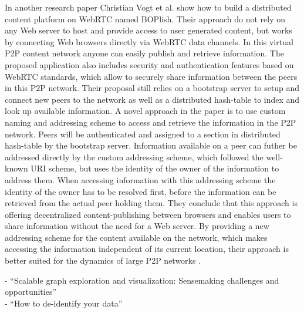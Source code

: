 In another research paper Christian Vogt et al. show how to build a distributed content platform on \gls{WebRTC} named BOPlish. Their approach do not rely on any Web server to host and provide access to user generated content, but works by connecting Web browsers directly via \gls{WebRTC} data channels. In this virtual \gls{P2P} content network anyone can easily publish and retrieve information. The proposed application also includes security and authentication features based on \gls{WebRTC} standards, which allow to securely share information between the peers in this \gls{P2P} network. Their proposal still relies on a bootstrap server to setup and connect new peers to the network as well as a distributed hash-table to index and look up available information. A novel approach in the paper is to use custom naming and addressing scheme to access and retrieve the information in the \gls{P2P} network. Peers will be authenticated and assigned to a section in distributed hash-table by the bootstrap server. Information available on a peer can futher be addressed directly by the custom addressing scheme, which followed the well-known \gls{URI} scheme, but uses the identity of the owner of the information to address them. When accessing information with this addressing scheme the identity of the owner has to be resolved first, before the information can be retrieved from the actual peer holding them. They conclude that this approach is offering decentralized content-publishing between browsers and enables users to share information without the need for a Web server. By providing a new addressing scheme for the content available on the network, which makes accessing the information independent of its current location, their approach is better suited for the dynamics of large \gls{P2P} networks \citep{vogt2013content}.


- ``Scalable graph exploration and visualization: Sensemaking challenges and opportunities'' \citep{pienta2015scalable} \\
- ``How to de-identify your data'' \citep{angiuli2015identify}

